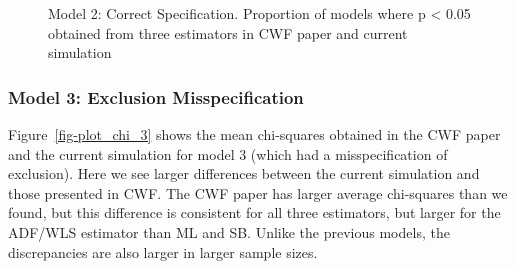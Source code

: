 \documentclass[
  letterpaper,
  DIV=11,
  numbers=noendperiod]{scrartcl}
\begin{document}
\begin{figure}[H]


\caption{\label{fig-plot_rejects_2}Model 2: Correct Specification.
Proportion of models where p \textless{} 0.05 obtained from three
estimators in CWF paper and current simulation}

\end{figure}%

\subsubsection{Model 3: Exclusion
Misspecification}\label{model-3-exclusion-misspecification}

Figure~\ref{fig-plot_chi_3} shows the mean chi-squares obtained in the
CWF paper and the current simulation for model 3 (which had a
misspecification of exclusion). Here we see larger differences between
the current simulation and those presented in CWF. The CWF paper has
larger average chi-squares than we found, but this difference is
consistent for all three estimators, but larger for the ADF/WLS
estimator than ML and SB. Unlike the previous models, the discrepancies
are also larger in larger sample sizes.
\end{document}
